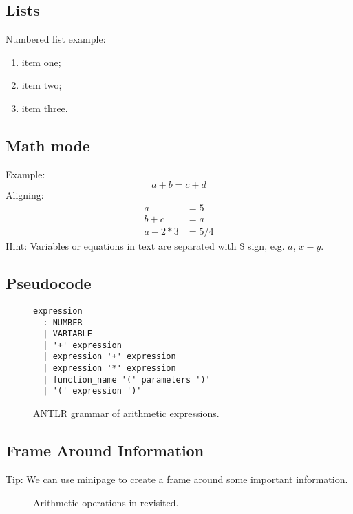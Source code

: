 \subsection{Lists}

Numbered list example:
\begin{enumerate}
	\item item one;
	\item item two;
	\item item three.
\end{enumerate}

\subsection{Math mode}
Example:
\begin{equation}
a + b = c + d
\label{eq:abcd}
\end{equation}
Aligning:
\begin{align*}
	a &= 5 \\
	b + c &= a \\
	a -2*3 &= 5/4
\end{align*}
Hint: Variables or equations in text are separated with \$ sign, e.g. $a$, $x - y$.

\subsection{Pseudocode}

\begin{figure} [htb]
\begin{verbatim}
expression
  : NUMBER
  | VARIABLE
  | '+' expression
  | expression '+' expression
  | expression '*' expression
  | function_name '(' parameters ')'
  | '(' expression ')'
\end{verbatim}
\caption{ANTLR grammar of arithmetic expressions.}
\label{fig:parser_exp}
\end{figure}

\subsection{Frame Around Information}

Tip: We can use minipage to create a frame around some important information.
\begin{figure} [h]
\caption{Arithmetic operations in \proveit revisited.}
\label{fig:aritmOp_revisit}
\end{figure}

